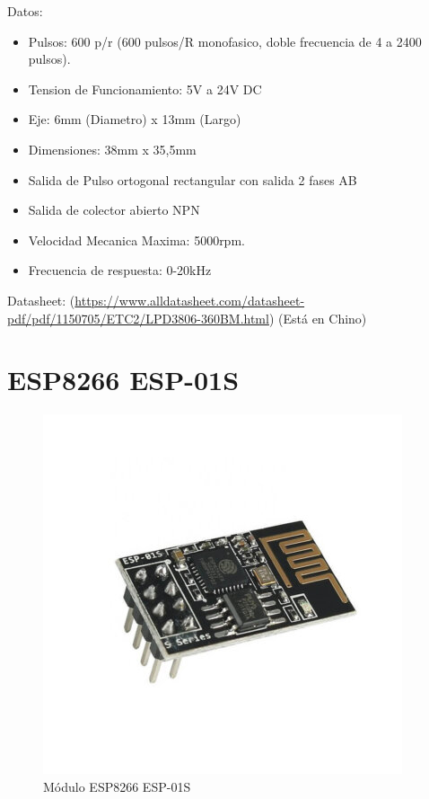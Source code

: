             Datos:\par
            
            \begin{itemize}[label=•]
                \setlength{\itemindent}{2em}
                
                \item Pulsos: 600 p/r (600 pulsos/R monofasico, doble frecuencia de 4 a 2400 pulsos).\par
                \item Tension de Funcionamiento: 5V a 24V DC
                \item Eje: 6mm (Diametro) x 13mm (Largo)\par
                \item Dimensiones: 38mm x 35,5mm\par
                \item Salida de Pulso ortogonal rectangular con salida 2 fases AB\par
                \item Salida de colector abierto NPN\par
                \item Velocidad Mecanica Maxima: 5000rpm.\par
                \item Frecuencia de respuesta: 0-20kHz\par
            \end{itemize}
            
            Datasheet: (\href{https://www.alldatasheet.com/datasheet-pdf/pdf/1150705/ETC2/LPD3806-360BM.html}{https://www.alldatasheet.com/datasheet-pdf/pdf/1150705/ETC2/LPD3806-360BM.html}) (Está en Chino)\par

    \newpage
    
    \section{ESP8266 ESP-01S}
    \label{esp8266}
        \begin{figure}[!ht]
            \centering
            \includegraphics[width=0.5\linewidth]{Anexo_C/ESP8266.png}
            \caption{Módulo ESP8266 ESP-01S}
            \label{fig:c4}
        \end{figure}
        
